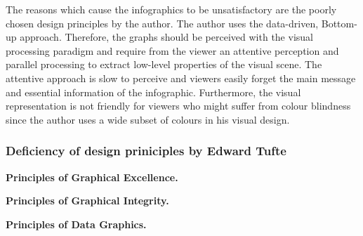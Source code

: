 \documentclass[a4paper, 11pt]{scrartcl}
\begin{document}
The reasons which cause the infographics to be unsatisfactory are the poorly
chosen design principles by the author. The author uses the data-driven,
Bottom-up approach. Therefore, the graphs should be perceived with the visual
processing paradigm and require from the viewer an attentive perception and
parallel processing to extract low-level properties of the visual scene. The
attentive approach is slow to perceive and viewers easily forget the main
message and essential information of the infographic. Furthermore, the visual
representation is not friendly for viewers who might suffer from colour
blindness since the author uses a wide subset of colours in his visual design.

\subsubsection{Deficiency of design priniciples by Edward Tufte}

\textbf{Principles of Graphical Excellence.} 


\textbf{Principles of Graphical Integrity.}


\textbf{Principles of Data Graphics.}

\end{document}
